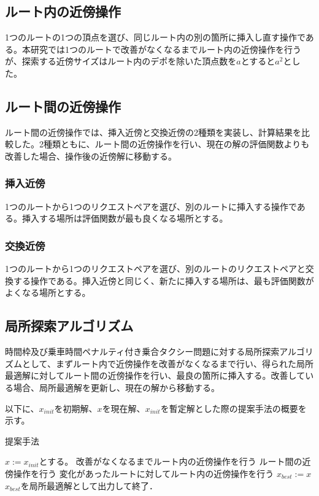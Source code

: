 \subsection{ルート内の近傍操作}
1つのルートの1つの頂点を選び、同じルート内の別の箇所に挿入し直す操作である。本研究では1つのルートで改善がなくなるまでルート内の近傍操作を行うが、探索する近傍サイズはルート内のデポを除いた頂点数を$a$とすると$a^2$とした。

\subsection{ルート間の近傍操作}
ルート間の近傍操作では、挿入近傍と交換近傍の2種類を実装し、計算結果を比較した。2種類ともに、ルート間の近傍操作を行い、現在の解の評価関数よりも改善した場合、操作後の近傍解に移動する。
\subsubsection{挿入近傍}
1つのルートから1つのリクエストペアを選び、別のルートに挿入する操作である。挿入する場所は評価関数が最も良くなる場所とする。
\subsubsection{交換近傍}
1つのルートから1つのリクエストペアを選び、別のルートのリクエストペアと交換する操作である。挿入近傍と同じく、新たに挿入する場所は、最も評価関数がよくなる場所とする。
\subsection{局所探索アルゴリズム}
時間枠及び乗車時間ペナルティ付き乗合タクシー問題に対する局所探索アルゴリズムとして、まずルート内で近傍操作を改善がなくなるまで行い、得られた局所最適解に対してルート間の近傍操作を行い、最良の箇所に挿入する。改善している場合、局所最適解を更新し、現在の解から移動する。

以下に、$x_{init}$を初期解、$x$を現在解、$x_{init}$を暫定解とした際の提案手法の概要を示す。
\begin{algorithm}
 \caption{提案手法}
 \label{algo1}
 \begin{algorithmic}[1]%
  \STATE $x := x_{init}$とする。
  \STATE 改善がなくなるまでルート内の近傍操作を行う
  \STATE ルート間の近傍操作を行う
  \STATE 変化があったルートに対してルート内の近傍操作を行う
  \STATE  $x_{best} := x$
  \ENDIF
  \STATE $x_{best}$を局所最適解として出力して終了．
 \end{algorithmic}
\end{algorithm}
